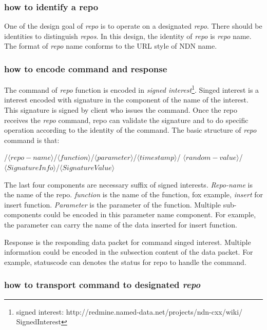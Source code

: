 \documentclass[conference]{IEEEtran}
\begin{document}
\subsubsection{how to identify a repo}

One of the design goal of \emph{repo} is to operate on a designated \emph{repo}. There should be identities to distinguish \emph{repos}. In this design, the identity of \emph{repo} is \emph{repo} name. The format of \emph{repo} name conforms to the URL style of NDN name.

\subsubsection{how to encode command and response}

The command of \emph{repo} function is encoded in \emph{signed interest}\footnote{signed interest: http://redmine.named-data.net/projects/ndn-cxx/wiki/
SignedInterest}. Singed interest is a interest encoded with signature in the component of the name of the interest. This signature is signed by client who issues the command. Once the repo receives the \emph{repo} command, repo can validate the signature and to do specific operation according to the identity of the command. The basic structure of \emph{repo} command is that:

/$\langle repo-name\rangle$/$\langle function\rangle$/$\langle parameter\rangle$/$\langle timestamp\rangle$/
$\langle random-value\rangle$/$\langle SignatureInfo\rangle$/$\langle SignatureValue\rangle$

The last four components are necessary suffix of signed interests. \emph{Repo-name} is the name of the repo. \emph{function} is the name of the function, fox example, \emph{insert} for insert function. \emph{Parameter} is the parameter of the function. Multiple sub-components could be encoded in this parameter name component. For example, the parameter can carry the name of the data inserted for insert function.

Response is the responding data packet for command singed interest. Multiple information could be encoded in the subsection content of the data packet. For example, statuscode can denotes the status for repo to handle the command.

\subsubsection{how to transport command to designated \emph{repo}}
\end{document}
